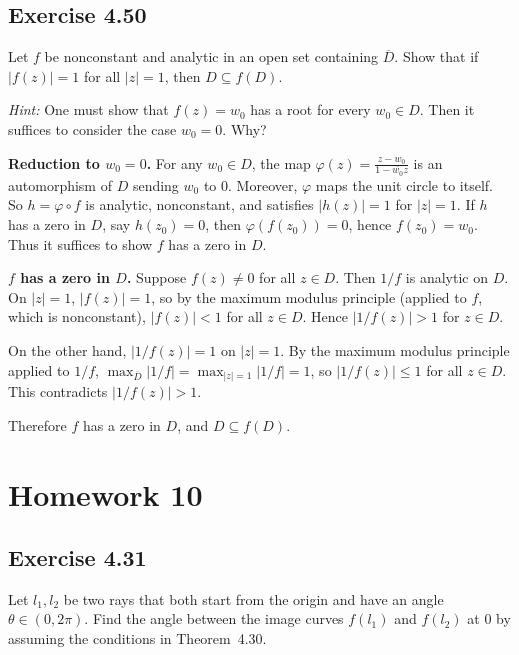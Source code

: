 \documentclass{article}
\begin{document}
\subsection{Exercise 4.50}
\label{sec:ca-ex-4-50}

Let $f$ be nonconstant and analytic in an open set containing
$\overline{D}$.  Show that if $|f(z)| = 1$ for all $|z| = 1$,
then $D \subseteq f(D)$.

\textit{Hint:} One must show that $f(z) = w_0$ has a root for
every $w_0 \in D$.  Then it suffices to consider the case
$w_0 = 0$.  Why?

\begin{solution}
  \textbf{Reduction to $w_0 = 0$.}
  For any $w_0 \in D$, the map
  $\varphi(z) = \frac{z - w_0}{1 - \overline{w_0}z}$
  is an automorphism of $D$ sending $w_0$ to $0$.
  Moreover, $\varphi$ maps the unit circle to itself.
  So $h = \varphi \circ f$ is analytic, nonconstant, and satisfies
  $|h(z)| = 1$ for $|z| = 1$.
  If $h$ has a zero in $D$, say $h(z_0) = 0$, then
  $\varphi(f(z_0)) = 0$, hence $f(z_0) = w_0$.
  Thus it suffices to show $f$ has a zero in $D$.

  \medskip
  \textbf{$f$ has a zero in $D$.}
  Suppose $f(z) \ne 0$ for all $z \in D$.
  Then $1/f$ is analytic on $D$. On $|z| = 1$, $|f(z)| = 1$,
  so by the maximum modulus principle (applied to $f$, which is
  nonconstant), $|f(z)| < 1$ for all $z \in D$.
  Hence $|1/f(z)| > 1$ for $z \in D$.

  On the other hand, $|1/f(z)| = 1$ on $|z| = 1$.
  By the maximum modulus principle applied to $1/f$,
  $\max_{\overline{D}} |1/f| = \max_{|z|=1} |1/f| = 1$,
  so $|1/f(z)| \le 1$ for all $z \in D$.
  This contradicts $|1/f(z)| > 1$.

  Therefore $f$ has a zero in $D$, and $D \subseteq f(D)$.
\end{solution}

\section{Homework 10}

\subsection{Exercise 4.31}

Let $l_1, l_2$ be two rays that both start from the origin and have an
angle $\theta \in (0, 2\pi)$. Find the angle between the image curves
$f(l_1)$ and $f(l_2)$ at $0$ by assuming the conditions in
Theorem~4.30.
\end{document}
